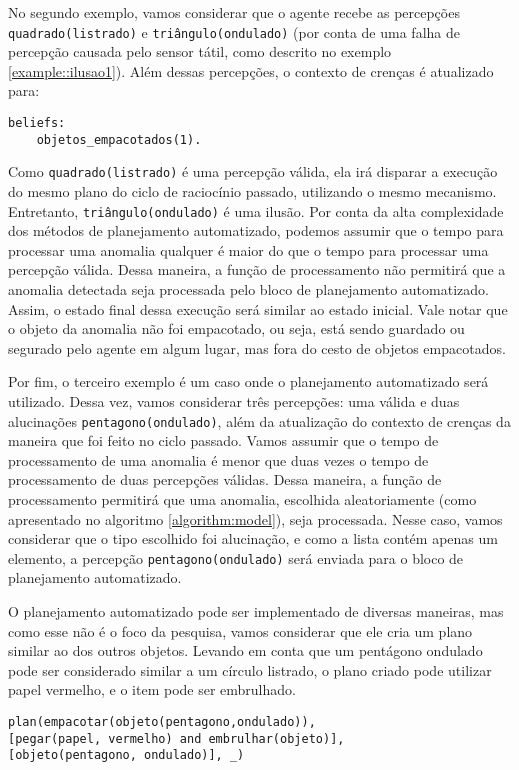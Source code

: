\begin{example}
    No segundo exemplo, vamos considerar que o agente recebe as percepções \texttt{quadrado(listrado)} e \texttt{triângulo(ondulado)} (por conta de uma falha de percepção causada pelo sensor tátil, como descrito no exemplo \ref{example::ilusao1}). Além dessas percepções, o contexto de crenças é atualizado para:
    
    \begin{lstlisting}
beliefs:
    objetos_empacotados(1).
    \end{lstlisting}{}
    
    Como \texttt{quadrado(listrado)} é uma percepção válida, ela irá disparar a execução do mesmo plano do ciclo de raciocínio passado, utilizando o mesmo mecanismo. Entretanto, \texttt{triângulo(ondulado)} é uma ilusão. Por conta da alta complexidade dos métodos de planejamento automatizado, podemos assumir que o tempo para processar uma anomalia qualquer é maior do que o tempo para processar uma percepção válida. Dessa maneira, a função de processamento não permitirá que a anomalia detectada seja processada pelo bloco de planejamento automatizado. Assim, o estado final dessa execução será similar ao estado inicial. Vale notar que o objeto da anomalia não foi empacotado, ou seja, está sendo guardado ou segurado pelo agente em algum lugar, mas fora do cesto de objetos empacotados.
    
\end{example}{}

\begin{example}
    Por fim, o terceiro exemplo é um caso onde o planejamento automatizado será utilizado. Dessa vez, vamos considerar três percepções: uma válida e duas alucinações \texttt{pentagono(ondulado)}, além da atualização do contexto de crenças da maneira que foi feito no ciclo passado. Vamos assumir que o tempo de processamento de uma anomalia é menor que duas vezes o tempo de processamento de duas percepções válidas. Dessa maneira, a função de processamento permitirá que uma anomalia, escolhida aleatoriamente (como apresentado no algoritmo \ref{algorithm:model}), seja processada. Nesse caso, vamos considerar que o tipo escolhido foi alucinação, e como a lista contém apenas um elemento, a percepção \texttt{pentagono(ondulado)} será enviada para o bloco de planejamento automatizado.
    
    O planejamento automatizado pode ser implementado de diversas maneiras, mas como esse não é o foco da pesquisa, vamos considerar que ele cria um plano similar ao dos outros objetos. Levando em conta que um pentágono ondulado pode ser considerado similar a um círculo listrado, o plano criado pode utilizar papel vermelho, e o item pode ser embrulhado.
    
    \begin{lstlisting}
plan(empacotar(objeto(pentagono,ondulado)),
[pegar(papel, vermelho) and embrulhar(objeto)],
[objeto(pentagono, ondulado)], _)
    \end{lstlisting}
    
\end{example}{}


